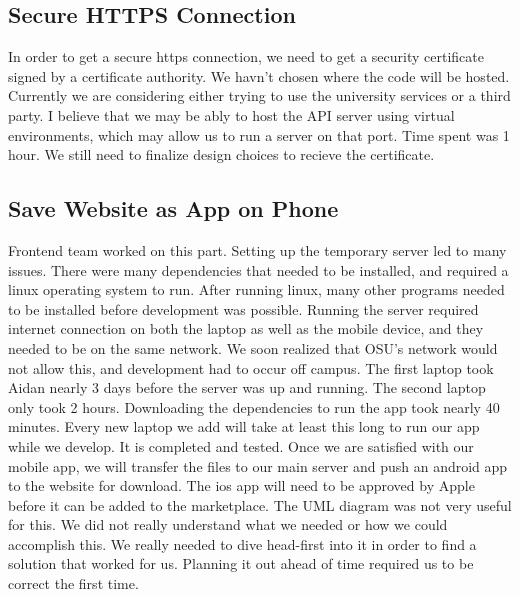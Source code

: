 \documentclass[12pt]{article}
\begin{document}
      \subsection{Secure HTTPS Connection}
      In order to get a secure https connection, we need to get a security certificate signed by a certificate authority.  We havn't chosen where the code will be hosted.  Currently we are considering either trying to use the university services or a third party.  I believe that we may be ably to host the API server using virtual environments, which may allow us to run a server on that port.  Time spent was 1 hour.  We still need to finalize design choices to recieve the certificate.
      \subsection{Save Website as App on Phone}
      Frontend team worked on this part.  Setting up the temporary server led to many issues. There were many dependencies that needed to be installed, and required a linux operating system to run. After running linux, many other programs needed to be installed before development was possible. Running the server required internet connection on both the laptop as well as the mobile device, and they needed to be on the same network. We soon realized that OSU’s network would not allow this, and development had to occur off campus. The first laptop took Aidan nearly 3 days before the server was up and running. The second laptop only took 2 hours. Downloading the dependencies to run the app took nearly 40 minutes. Every new laptop we add will take at least this long to run our app while we develop. It is completed and tested. Once we are satisfied with our mobile app, we will transfer the files to our main server and push an android app to the website for download. The ios app will need to be approved by Apple before it can be added to the marketplace. The UML diagram was not very useful for this. We did not really understand what we needed or how we could accomplish this. We really needed to dive head-first into it in order to find a solution that worked for us. Planning it out ahead of time required us to be correct the first time.
\end{document}
